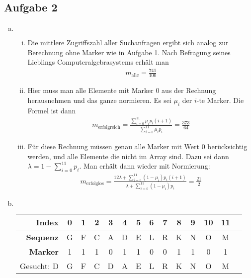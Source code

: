 \documentclass[11pt]{article}
\begin{document}
\subsection*{Aufgabe 2}
\begin{enumerate}[a)]
  \item  $ $
    \begin{enumerate}[i)]
      \item Die mittlere Zugriffszahl aller Suchanfragen ergibt sich analog
        zur Berechnung ohne Marker wie in Aufgabe 1. Nach Befragung seines
        Lieblings Computeralgebrasystems erh\"alt man
        \begin{align*}
          m_\text{alle} = \frac{741}{100}
        \end{align*}
      \item Hier muss man alle Elemente mit Marker 0 aus der Rechnung 
        herausnehmen und das ganze normieren. 
        Es sei $\mu_i$ der $i$-te Marker. Die Formel ist dann
        \begin{align*}
          m_\text{erfolgreich} = \frac{\sum_{i=0}^{11} \mu_i p_i (i+1)}{
          \sum_{i=0}^{11} \mu_i p_i} = \frac{373}{64}
        \end{align*}
      \item F\"ur diese Rechnung m\"ussen genau alle Marker mit Wert 0
        ber\"ucksichtig werden, und alle Elemente die nicht im Array sind.
        Dazu sei dann $\lambda = 1 - \sum_{i=0}^{11} p_i$.
        Man erh\"alt dann wieder mit Normierung:
        \begin{align*}
          m_\text{erfolglos} = \frac{12 \lambda + \sum_{i=0}^{11} (1-\mu_i) p_i (i+1) }{
          \lambda + \sum_{i=0}^{11} (1-\mu_i) p_i } = \frac{21}{2}
        \end{align*}
    \end{enumerate} 
\newpage
  \item $ $
    \begin{table}[h!]
      \centering
      \begin{tabular}{r | c c c c c c c c c c c c c}
        \hline\hline
        \textbf{Index} & 0 & 1 & 2 & 3 & 4 & 5 & 6 & 7 & 8 & 9 & 10 & 11 \\
        \hline
        \textbf{Sequenz} & G & F & C & A & D & E & L & R & K & N & O & M \\
        \textbf{Marker} & 1 & 1 & 1 & 0 & 1 & 1 & 0 & 0 & 1 & 1 & 0 & 1 \\
        \hline
        Gesucht: D  & G & F & C & D & A & E & L & R & K & N & O & M \\

\end{tabular}
\end{table}
\end{enumerate}
\end{document}
